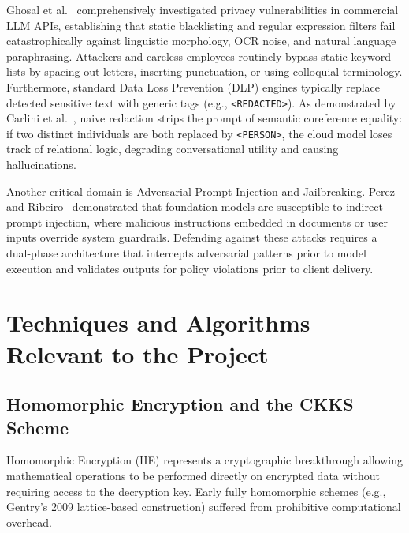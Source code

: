 \documentclass[12pt,a4paper,oneside]{report}
\numberwithin{equation}{chapter}
\begin{document}
Ghosal et al.~\cite{ghosal2023llm} comprehensively investigated privacy vulnerabilities in commercial LLM APIs, establishing that static blacklisting and regular expression filters fail catastrophically against linguistic morphology, OCR noise, and natural language paraphrasing. Attackers and careless employees routinely bypass static keyword lists by spacing out letters, inserting punctuation, or using colloquial terminology. Furthermore, standard Data Loss Prevention (DLP) engines typically replace detected sensitive text with generic tags (e.g., \texttt{<REDACTED>}). As demonstrated by Carlini et al.~\cite{carlini2021extracting}, naive redaction strips the prompt of semantic coreference equality: if two distinct individuals are both replaced by \texttt{<PERSON>}, the cloud model loses track of relational logic, degrading conversational utility and causing hallucinations.

Another critical domain is Adversarial Prompt Injection and Jailbreaking. Perez and Ribeiro~\cite{perez2022ignore} demonstrated that foundation models are susceptible to indirect prompt injection, where malicious instructions embedded in documents or user inputs override system guardrails. Defending against these attacks requires a dual-phase architecture that intercepts adversarial patterns prior to model execution and validates outputs for policy violations prior to client delivery.

\section{Techniques and Algorithms Relevant to the Project}

\subsection{Homomorphic Encryption and the CKKS Scheme}
Homomorphic Encryption (HE) represents a cryptographic breakthrough allowing mathematical operations to be performed directly on encrypted data without requiring access to the decryption key. Early fully homomorphic schemes (e.g., Gentry's 2009 lattice-based construction) suffered from prohibitive computational overhead. 
\end{document}
